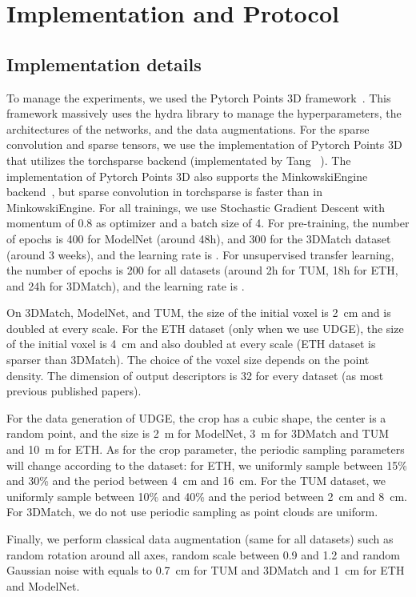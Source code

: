 \documentclass[10pt,twocolumn,letterpaper]{article}
\begin{document}
\section{Implementation and Protocol}

\subsection{Implementation details}
To manage the experiments, we used the Pytorch Points 3D framework~\cite{tp3d}. This framework massively uses the hydra library to manage the hyperparameters, the architectures of the networks, and the data augmentations.
For the sparse convolution and sparse tensors, we use the implementation of Pytorch Points 3D that utilizes the torchsparse backend (implementated by Tang \etal~\cite{tang2020searching}). The implementation of Pytorch Points 3D also supports the MinkowskiEngine backend~\cite{choy20194d}, but sparse convolution in torchsparse is faster than in MinkowskiEngine. For all trainings, we use Stochastic Gradient Descent with momentum of 0.8 as optimizer and a batch size of 4. For pre-training, the number of epochs is 400 for ModelNet (around 48h), and 300 for the 3DMatch dataset (around 3 weeks), and the learning rate is . For unsupervised transfer learning, the number of epochs is 200 for all datasets (around 2h for TUM, 18h for ETH, and 24h for 3DMatch), and the learning rate is . 


On 3DMatch, ModelNet, and TUM, the size of the initial voxel is 2~cm and is doubled at every scale. For the ETH dataset (only when we use UDGE), the size of the initial voxel is 4~cm and also doubled at every scale (ETH dataset is sparser than 3DMatch). The choice of the voxel size depends on the point density.
The dimension of output descriptors is 32 for every dataset (as most previous published papers).

For the data generation of UDGE, the crop has a cubic shape, the center is a random point, and the size is 2~m for ModelNet, 3~m for 3DMatch and TUM and 10~m for ETH. As for the crop parameter, the periodic sampling parameters will change according to the dataset: for ETH, we uniformly sample  between 15\% and 30\% and the period  between 4~cm and 16~cm. For the TUM dataset, we uniformly sample  between 10\% and 40\% and the period  between 2~cm and 8~cm. For 3DMatch, we do not use periodic sampling as point clouds are uniform.

Finally, we perform classical data augmentation (same for all datasets) such as random rotation around all axes, random scale between 0.9 and 1.2 and random Gaussian noise with  equals to 0.7~cm for TUM and 3DMatch and 1~cm for ETH and ModelNet. 
\end{document}
